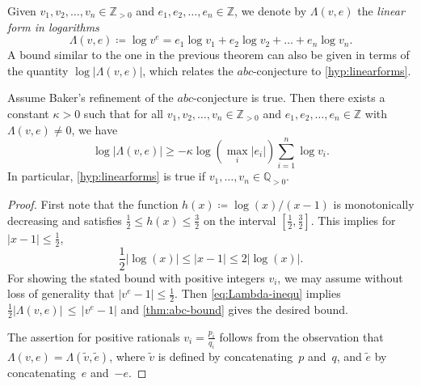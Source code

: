 \documentclass[a4paper,USenglish,cleveref,numberwithinsect]{lipics-v2021}
\newcommand{\QQ}{\mathbb{Q}}
\newcommand{\ZZ}{\mathbb{Z}}
\numberwithin{equation}{section}
\begin{document}
Given $v_1,v_2,\dots,v_n\in\ZZ_{>0}$ and $e_1,e_2,\dots,e_n\in\ZZ$,
we denote by $\Lambda(v,e)$ the \textit{linear form in logarithms}
\begin{equation}\label{eq:DEF-Lambda}
 \Lambda(v,e)\coloneqq \log v^e = e_1 \log v_1 + e_2 \log v_2 +\dots +e_n \log v_n.
\end{equation}
A bound similar to the one in the previous theorem can also be given in terms of the quantity
$\log|\Lambda(v,e)|$, which relates the $abc$-conjecture to \cref{hyp:linearforms}.

\begin{corollary}\label{cor:abc-bound-log}
Assume Baker's refinement of the $abc$-conjecture is true.
Then there exists a constant $\kappa>0$ such that for all
$v_1,v_2,\dots,v_n\in\ZZ_{>0}$ and $e_1,e_2,\dots,e_n\in\ZZ$ with $\Lambda(v,e)\neq 0$,
we have
\[
 \log|\Lambda(v,e)|\geq -\kappa\log(\max_i |e_i|)\sum_{i=1}^n \log v_i.
\]
In particular, \cref{hyp:linearforms} is true if $v_1,\ldots, v_n\in\QQ_{>0}$.
\end{corollary}

\begin{proof}
First note that the function $h(x)\coloneqq \log(x)/(x-1)$ is monotonically decreasing
and satisfies
$\frac12 \le h(x) \le \frac32$
on the interval $[\frac12,\frac32]$.
This implies for $|x-1| \le \frac12$,
\begin{equation}\label{eq:Lambda-inequ}
    \frac{1}{2} |\log(x)| \leq |x-1| \leq 2 |\log(x)|.
\end{equation}
For showing the stated bound with positive integers $v_i$,
we may assume without loss of generality that $|v^e-1|\leq \frac{1}{2}$.
Then \cref{eq:Lambda-inequ} implies
$\frac{1}{2}|\Lambda(v,e)| \, \leq \, |v^e-1|$
and \cref{thm:abc-bound} gives the desired bound.

The assertion for positive rationals $v_i = \frac{p_i}{q_i}$ follows from
the observation that
$\Lambda(v,e) = \Lambda(\tilde v,\tilde e)$, where $\tilde v$ is defined by concatenating~$p$ and~$q$, and $\tilde e$ by concatenating~$e$ and~$-e$.
\end{proof}
\end{document}
